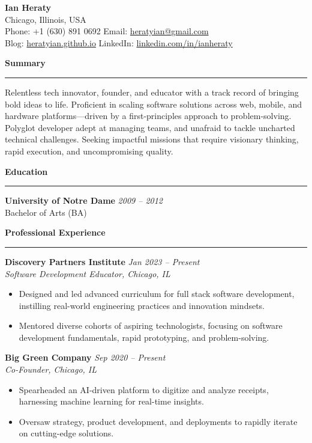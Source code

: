 \documentclass[letterpaper,10pt]{article}
\newcommand{\resheading}[1]{
  \vspace{10pt}
  \textbf{\large #1}
  \vspace{5pt}
  \hrule
  \vspace{5pt}
}
\begin{document}
\begin{center}
    {\LARGE \textbf{Ian Heraty}} \\
    Chicago, Illinois, USA \\
    Phone: +1 (630) 891 0692 \quad\textbullet\quad 
    Email: \href{mailto:heratyian@gmail.com}{heratyian@gmail.com} \\
    Blog: \href{http://heratyian.github.io}{heratyian.github.io} \quad\textbullet\quad
    LinkedIn: \href{https://www.linkedin.com/in/ianheraty}{linkedin.com/in/ianheraty}
\end{center}

\resheading{Summary}
Relentless tech innovator, founder, and educator with a track record of 
bringing bold ideas to life. Proficient in scaling software solutions across 
web, mobile, and hardware platforms—driven by a first-principles approach 
to problem-solving. Polyglot developer adept at 
managing teams, and unafraid to tackle uncharted technical challenges. 
Seeking impactful missions that require visionary thinking, rapid execution, 
and uncompromising quality.

\resheading{Education}
\textbf{University of Notre Dame} \hfill \textit{2009 -- 2012}\\
Bachelor of Arts (BA)

\resheading{Professional Experience}

\textbf{Discovery Partners Institute} \hfill \textit{Jan 2023 -- Present}\\
\emph{Software Development Educator, Chicago, IL}\\
\begin{itemize}
  \item Designed and led advanced curriculum for full stack software development, 
        instilling real-world engineering practices and innovation mindsets.
  \item Mentored diverse cohorts of aspiring technologists, focusing on 
        software development fundamentals, rapid prototyping, and problem-solving.
\end{itemize}

\textbf{Big Green Company} \hfill \textit{Sep 2020 -- Present}\\
\emph{Co-Founder, Chicago, IL}\\
\begin{itemize}
    \item Spearheaded an AI-driven platform to digitize and analyze receipts, 
    harnessing machine learning for real-time insights.
    \item Oversaw strategy, product development, and deployments to rapidly iterate on cutting-edge solutions.
\end{itemize}
\end{document}
